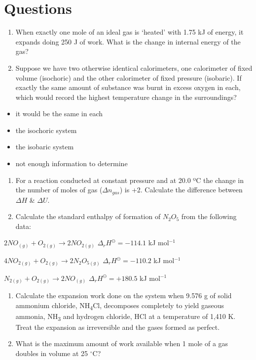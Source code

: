 \documentclass[
]{book}
\providecommand{\tightlist}{%
  \setlength{\itemsep}{0pt}\setlength{\parskip}{0pt}}
\begin{document}
\hypertarget{questions-1}{%
\section{Questions}\label{questions-1}}

\begin{enumerate}
\def\labelenumi{\arabic{enumi}.}
\item
  When exactly one mole of an ideal gas is `heated' with 1.75 kJ of energy, it expands doing 250 J of work. What is the change in internal energy of the gas?
\item
  Suppose we have two otherwise identical calorimeters, one calorimeter of fixed volume (isochoric) and the other calorimeter of fixed pressure (isobaric). If exactly the same amount of substance was burnt in excess oxygen in each, which would record the highest temperature change in the surroundings?
\end{enumerate}

\begin{itemize}
\tightlist
\item
  it would be the same in each
\item
  the isochoric system
\item
  the isobaric system
\item
  not enough information to determine
\end{itemize}

\begin{enumerate}
\def\labelenumi{\arabic{enumi}.}
\setcounter{enumi}{2}
\item
  For a reaction conducted at constant pressure and at 20.0 ºC the change in the number of moles of gas (\(\Delta n_{gas}\)) is +2. Calculate the difference between \(\Delta H\) \& \(\Delta U\).
\item
  Calculate the standard enthalpy of formation of \(N_2 O_5\) from the following data:
\end{enumerate}

\(2 NO_{(g)} + O_{2(g)} \longrightarrow 2 NO_{2(g)}\) \(\Delta _r H^\ominus = -114.1\) kJ mol\(^{-1}\)

\(4 NO_{2(g)} + O_{2(g)} \longrightarrow 2 N_2 O_{5(g)}\) \(\Delta _r H^\ominus = -110.2\) kJ mol\(^{-1}\)

\(N_{2(g)} + O_{2(g)} \longrightarrow 2 NO_{(g)}\) \(\Delta _r H^\ominus = +180.5\) kJ mol\(^{-1}\)

\begin{enumerate}
\def\labelenumi{\arabic{enumi}.}
\setcounter{enumi}{4}
\item
  Calculate the expansion work done on the system when 9.576 g of solid ammonium chloride, NH\textsubscript{4}Cl, decomposes completely to yield gaseous ammonia, NH\textsubscript{3} and hydrogen chloride, HCl at a temperature of 1,410 K. Treat the expansion as irreversible and the gases formed as perfect.
\item
  What is the maximum amount of work available when 1 mole of a gas doubles in volume at 25 \(^\circ\)C?
\end{enumerate}
\end{document}
